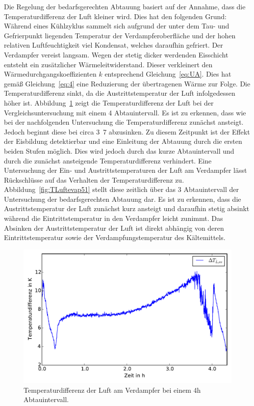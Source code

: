 Die Regelung der bedarfsgerechten Abtauung basiert auf der Annahme, dass die Temperaturdifferenz der Luft kleiner wird. Dies hat den folgenden Grund:
Während eines Kühlzyklus sammelt sich aufgrund der unter dem Tau- und Gefrierpunkt liegenden Temperatur der Verdampferoberfläche und der hohen relativen Luftfeuchtigkeit viel Kondensat, welches daraufhin gefriert. Der Verdampfer vereist langsam. Wegen der stetig dicker werdenden Eisschicht entsteht ein zusätzlicher Wärmeleitwiderstand. Dieser verkleinert den Wärmedurchgangskoeffizienten $k$ entsprechend Gleichung~\ref{eq:UA}. Dies hat gemäß Gleichung~\ref{eq:4} eine Reduzierung der übertragenen Wärme zur Folge. Die Temperaturdifferenz sinkt, da die Austrittstemperatur der Luft infolgedessen höher ist. \newline
Abbildung~\ref{fig:deltaTLuftevap50} zeigt die Temperaturdifferenz der Luft bei der Vergleichsuntersuchung mit einem \unit{4}{\hour} Abtauintervall. Es ist zu erkennen, dass wie bei der nachfolgenden Untersuchung die Temperaturdifferenz zunächst ansteigt. Jedoch beginnt diese bei circa \unit{3.7}{\hour} abzusinken. Zu diesem Zeitpunkt ist der Effekt der Eisbildung detektierbar und eine Einleitung der Abtauung durch die ersten beiden Stufen möglich. Dies wird jedoch durch das kurze Abtauintervall und durch die zunächst ansteigende Temperaturdifferenz verhindert. \newline 
Eine Untersuchung der Ein- und Austrittstemperaturen der Luft am Verdampfer lässt Rückschlüsse auf das Verhalten der Temperaturdifferenz zu.
Abbildung~\ref{fig:TLuftevap51} stellt diese zeitlich über das \unit{3}{\hour} Abtauintervall der Untersuchung der bedarfsgerechten Abtauung dar.
Es ist zu erkennen, dass die Austrittstemperatur der Luft zunächst kurz ansteigt und daraufhin stetig absinkt während die Eintrittstemperatur in den Verdampfer leicht zunimmt. Das Absinken der Austrittstemperatur der Luft ist direkt abhängig von deren Eintrittstemperatur sowie der Verdampfungstemperatur des Kältemittels.

\begin{figure}[h]
\centering
\includegraphics[scale=0.8]{Pictures/50/delTaT_evap.pdf}
\caption{Temperaturdifferenz der Luft am Verdampfer bei einem 4h Abtauintervall.}
\label{fig:deltaTLuftevap50}
\end{figure}


